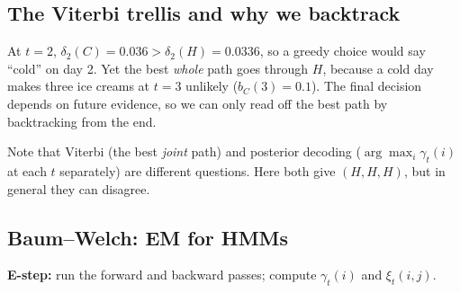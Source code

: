 \documentclass[11pt,a4paper]{article}
\begin{document}
\subsection{The Viterbi trellis and why we backtrack}

\begin{center}
\end{center}

\begin{caution}
At $t=2$, $\delta_2(C)=0.036>\delta_2(H)=0.0336$, so a greedy choice would say ``cold'' on day 2. Yet the best \emph{whole} path goes through $H$, because a cold day makes three ice creams at $t=3$ unlikely ($b_C(3)=0.1$). The final decision depends on future evidence, so we can only read off the best path by backtracking from the end.
\end{caution}

Note that Viterbi (the best \emph{joint} path) and posterior decoding ($\arg\max_i\gamma_t(i)$ at each $t$ separately) are different questions. Here both give $(H,H,H)$, but in general they can disagree.

\subsection{Baum--Welch: EM for HMMs}

\textbf{E-step:} run the forward and backward passes; compute $\gamma_t(i)$ and $\xi_t(i,j)$.
\end{document}
